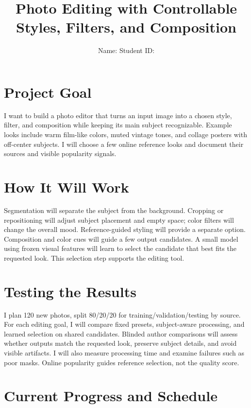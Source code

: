 \documentclass{article}
\title{Photo Editing with Controllable\\Styles, Filters, and Composition}
\author{Name: \AuthorName\quad Student ID: \StudentID}
\begin{document}
\maketitle
\section{Project Goal}

I want to build a photo editor that turns an input image into a chosen style, filter, and composition while keeping its main subject recognizable. Example looks include warm film-like colors, muted vintage tones, and collage posters with off-center subjects. I will choose a few online reference looks and document their sources and visible popularity signals.

\section{How It Will Work}

Segmentation will separate the subject from the background. Cropping or repositioning will adjust subject placement and empty space; color filters will change the overall mood. Reference-guided styling \citep{wang2024instantstyle} will provide a separate option. Composition and color cues \citep{celona2022composition} will guide a few output candidates. A small model using frozen visual features \citep{oquab2023dinov2} will learn to select the candidate that best fits the requested look. This selection step supports the editing tool.

\section{Testing the Results}

I plan 120 new photos, split 80/20/20 for training/validation/testing by source. For each editing goal, I will compare fixed presets, subject-aware processing, and learned selection on shared candidates. Blinded author comparisons will assess whether outputs match the requested look, preserve subject details, and avoid visible artifacts. I will also measure processing time and examine failures such as poor masks. Online popularity guides reference selection, not the quality score.

\section{Current Progress and Schedule}
\end{document}
